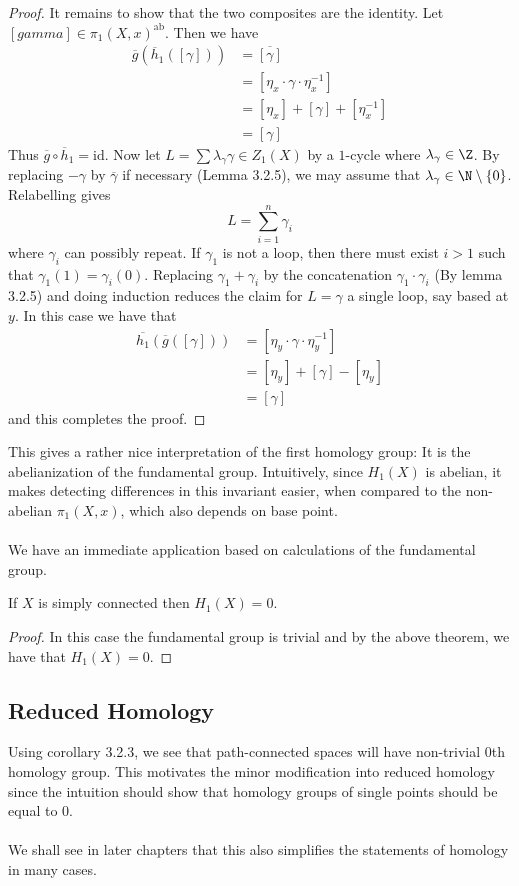 \documentclass[a4paper]{article}
\begin{document}
\begin{thm}{}{}
\begin{proof}
It remains to show that the two composites are the identity. Let $[gamma]\in\pi_1(X,x)^\text{ab}$. Then we have 
\begin{align*}
\overline{g}(\overline{h}_1([\gamma]))&=\overline{[\gamma]}\\
&=[\eta_x\cdot\gamma\cdot\eta_x^{-1}]\\
&=[\eta_x]+[\gamma]+[\eta_x^{-1}]\\
&=[\gamma]
\end{align*}
Thus $\overline{g}\circ\overline{h}_1=\text{id}$. Now let $L=\sum\lambda_\gamma\gamma\in Z_1(X)$ by a $1$-cycle where $\lambda_\gamma\in\Z$. By replacing $-\gamma$ by $\overline{\gamma}$ if necessary (Lemma 3.2.5), we may assume that $\lambda_\gamma\in\N\setminus\{0\}$. Relabelling gives $$L=\sum_{i=1}^n\gamma_i$$ where $\gamma_i$ can possibly repeat. If $\gamma_1$ is not a loop, then there must exist $i>1$ such that $\gamma_1(1)=\gamma_i(0)$. Replacing $\gamma_1+\gamma_i$ by the concatenation $\gamma_1\cdot\gamma_i$ (By lemma 3.2.5) and doing induction reduces the claim for $L=\gamma$ a single loop, say based at $y$. In this case we have that 
\begin{align*}
\overline{h_1}(\overline{g}([\gamma]))&=[\eta_y\cdot\gamma\cdot\eta_y^{-1}]\\
&=[\eta_y]+[\gamma]-[\eta_y]\\
&=[\gamma]
\end{align*}
and this completes the proof. 
\end{proof}
\end{thm}

This gives a rather nice interpretation of the first homology group: It is the abelianization of the fundamental group. Intuitively, since $H_1(X)$ is abelian, it makes detecting differences in this invariant easier, when compared to the non-abelian $\pi_1(X,x)$, which also depends on base point. \\~\\

We have an immediate application based on calculations of the fundamental group. 

\begin{crl}{}{} If $X$ is simply connected then $H_1(X)=0$. \tcbline
\begin{proof}
In this case the fundamental group is trivial and by the above theorem, we have that $H_1(X)=0$. 
\end{proof}
\end{crl}

\subsection{Reduced Homology}
Using corollary 3.2.3, we see that path-connected spaces will have non-trivial $0$th homology group. This motivates the minor modification into reduced homology since the intuition should show that homology groups of single points should be equal to $0$. \\~\\
We shall see in later chapters that this also simplifies the statements of homology in many cases. 
\end{document}
